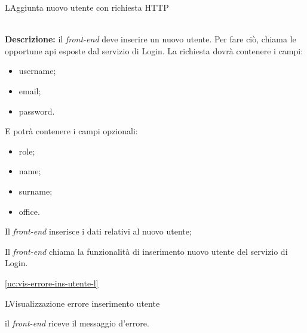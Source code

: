 \begin{usecase}{2}{L}{Aggiunta nuovo utente con richiesta HTTP}


	\textbf{\\Descrizione:} il \textit{front-end} deve inserire un nuovo utente. Per fare ciò,
	chiama le opportune \acrshort{api} esposte dal servizio di Login. La richiesta dovrà contenere i campi:
	\begin{itemize}[noitemsep]
		\item username;
		\item email;
		\item password.
	\end{itemize}
	E potrà contenere i campi opzionali:
	\begin{itemize}[noitemsep]
		\item role;
		\item name;
		\item surname;
		\item office.
	\end{itemize}

	\begin{ucscenarioprincipale}
		\item Il \textit{front-end} inserisce i dati relativi al nuovo utente;
		\item Il \textit{front-end} chiama la funzionalità di inserimento nuovo utente del servizio di Login.
	\end{ucscenarioprincipale}


	\begin{ucestensioni}
		\item \ref{uc:vis-errore-ins-utente-l}
	\end{ucestensioni}

	\label{uc:richiesta-aggiunta-utente-l}
\end{usecase}

\begin{usecase}{3}{L}{Visualizzazione errore inserimento utente}



	\begin{ucscenarioprincipale}
		\item il \textit{front-end} riceve il messaggio d'errore.
	\end{ucscenarioprincipale}


	\label{uc:vis-errore-ins-utente-l}
\end{usecase}

